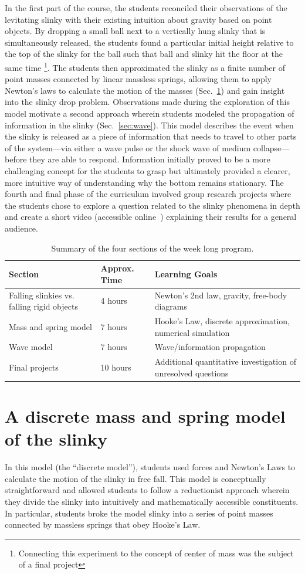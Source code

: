 \documentclass[pre,preprint,superscriptaddress,longbibliography]{revtex4-1}
\renewcommand{\sec}[1]{section~\ref{sec:#1}}
\newcommand{\fig}[1]{figure~\ref{fig:#1}}
\newcommand{\TABcurriculum}{
\begin{table}[h]\centering
\begin{tabular}{p{6.5cm}lp{6.5cm}}
\textbf{Section} & \textbf{Approx. Time} & \textbf{Learning Goals}\\
\hline
Falling slinkies vs. falling rigid objects & 4 hours & Newton's 2nd law, gravity, free-body diagrams\\
Mass and spring model & 7 hours & Hooke's Law, discrete approximation, numerical simulation\\
Wave model &  7 hours & Wave/information propagation \\
Final projects & 10 hours & Additional quantitative investigation of unresolved questions

\end{tabular}
\caption{\label{tab:curriculum} Summary of the four sections of the week long program.}
\end{table}
}
\begin{document}
In the first part of the course, the students reconciled their observations of the levitating slinky with their existing intuition about gravity based on point objects.  By dropping a small ball next to a vertically hung slinky that is simultaneously released, the students found a particular initial height relative to the top of the slinky for the ball such that ball and slinky hit the floor at the same time \footnote{Connecting this experiment to the concept of center of mass was the subject of a final project}.
The students then approximated the slinky as a finite number of point masses connected by linear massless springs, allowing them to apply  Newton's laws to calculate the motion of the masses  (Sec.~\ref{sec:discrete})  and gain insight into the slinky drop problem.  
Observations made during the exploration of this model motivate a second approach wherein students modeled the propagation of information in the slinky (Sec.~\ref{sec:wave}). This model describes the event when the slinky is released as a piece of information that needs to travel to other parts of the system---via either a wave pulse or the shock wave of medium collapse---before they are able to respond.  Information initially proved to be a more challenging concept for the students to grasp but ultimately provided a clearer, more intuitive way of understanding why the bottom remains stationary.  %
The fourth and final phase of the curriculum involved group research projects where the students chose to explore a question related to the slinky phenomena in depth and create a short video  (accessible online~\cite{compassyoutube}) explaining their results for a general audience. 

\TABcurriculum


\section{A discrete mass and spring  model of the slinky}
\label{sec:discrete}
In this model (the ``discrete model''), students used forces and Newton's Laws to calculate the
motion of the slinky in free fall. This
model is conceptually straightforward and allowed students to follow a
reductionist approach wherein they divide the slinky into intuitively and mathematically accessible
constituents. In particular, students broke the model slinky into a series of point masses connected by massless springs that obey Hooke's Law.%
\end{document}
